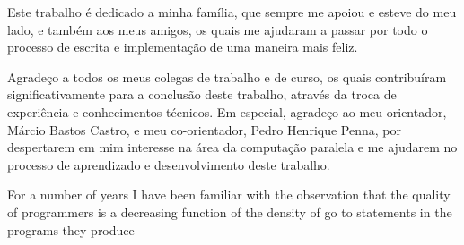 \newcommand{\mppa}{MPPA-256\xspace}
\newcommand{\capb}{CAP Bench\xspace}
\newcommand{\epiphany}{Adapteva Epiphany\xspace}
\newcommand{\manycore}{\textit{manycore}\xspace}
\newcommand{\manycores}{\textit{manycores}\xspace}
\newcommand{\bench}{\textit{benchmark}\xspace}


\imprimircapa%
\imprimirfolhaderosto*
\protect{}
\imprimirfolhadecertificacao


\begin{dedicatoria}
  Este trabalho é dedicado a minha família, que sempre me apoiou e esteve do meu lado, e também aos meus amigos, os quais me ajudaram a passar por todo o processo de escrita e implementação de uma maneira mais feliz.
\end{dedicatoria}


\begin{agradecimentos}
  Agradeço a todos os meus colegas de trabalho e de curso, os quais contribuíram significativamente para a conclusão deste trabalho, através da troca de experiência e conhecimentos técnicos. Em especial, agradeço ao meu orientador, Márcio Bastos Castro, e meu co-orientador, Pedro Henrique Penna, por despertarem em mim interesse na área da computação paralela e me ajudarem no processo de aprendizado e desenvolvimento deste trabalho.
\end{agradecimentos}


\begin{epigrafe}
  For a number of years I have been familiar with the observation that the quality of programmers is a decreasing function of the density of go to statements in the programs they produce \\
  \cite{dijkstra1968}
\end{epigrafe}


